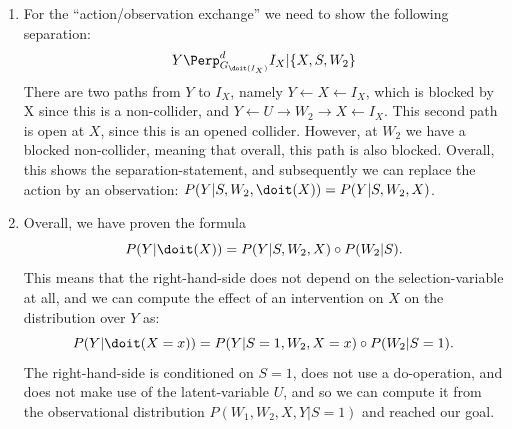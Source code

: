 \begin{enumerate}
\begin{gradedsolution}
\begin{enumerate}
      \item {} For the ``action/observation exchange'' we need to show the following separation:
      \begin{equation*}
        Y \Perp_{G_{\doit(I_X)}}^d I_X | \{X, S, W_2\}
      \end{equation*}
      There are two paths from $Y$ to $I_X$, namely $Y \leftarrow X \leftarrow I_X$, which is blocked by X since this is a non-collider, and $Y \leftarrow U \rightarrow W_2 \rightarrow X \leftarrow I_X$.
      This second path is open at $X$, since this is an opened collider. However, at $W_2$ we have a blocked non-collider, meaning that overall, this path is also blocked.
      Overall, this shows the separation-statement, and subsequently we can replace the action by an observation: $P(Y | S, W_2, \doit(X)) = P(Y | S, W_2, X) $.
      \item {} Overall, we have proven the formula
      \begin{equation*}
        P(Y | \doit(X)) = P(Y | S, W_2, X) \circ P(W_2 | S).
      \end{equation*}
      This means that the right-hand-side does not depend on the selection-variable at all, and we can compute the effect of an intervention on $X$ on the distribution over $Y$ as:
      \begin{equation*}
        P(Y | \doit(X = x)) = P(Y | S = 1, W_2, X = x) \circ P(W_2 | S = 1).
      \end{equation*}
      The right-hand-side is conditioned on $S=1$, does not use a do-operation, and does not make use of the latent-variable $U$, and so we can compute it from the observational distribution $P(W_1, W_2, X, Y | S=1)$ and reached our goal.
    \end{enumerate}
  \end{gradedsolution}

\end{enumerate}


